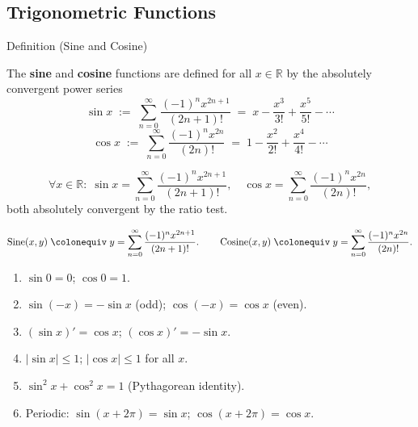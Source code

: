 
\subsection*{Trigonometric Functions}
\label{sec:trigonometric}

\begin{definitionbox}{Definition (Sine and Cosine)}
\begin{definition}
\label{def:sine-cosine}
The \textbf{sine} and \textbf{cosine} functions are defined for all
$x \in \mathbb{R}$ by the absolutely convergent power series
\[
  \sin x \;:=\;
  \sum_{n=0}^{\infty} \frac{(-1)^n x^{2n+1}}{(2n+1)!}
  \;=\; x - \frac{x^3}{3!} + \frac{x^5}{5!} - \cdots
\]
\[
  \cos x \;:=\;
  \sum_{n=0}^{\infty} \frac{(-1)^n x^{2n}}{(2n)!}
  \;=\; 1 - \frac{x^2}{2!} + \frac{x^4}{4!} - \cdots
\]
\end{definition}
\end{definitionbox}\begin{remark*}
\[
  \forall x \in \mathbb{R} :\;
  \sin x = \sum_{n=0}^\infty \frac{(-1)^n x^{2n+1}}{(2n+1)!},
  \quad
  \cos x = \sum_{n=0}^\infty \frac{(-1)^n x^{2n}}{(2n)!},
\]
both absolutely convergent by the ratio test.
\end{remark*}

\begin{remark*}
\[
  \operatorname{Sine}(x,y)
  \;\colonequiv\;
  y = \sum_{n=0}^\infty \frac{(-1)^n x^{2n+1}}{(2n+1)!}.
  \qquad
  \operatorname{Cosine}(x,y)
  \;\colonequiv\;
  y = \sum_{n=0}^\infty \frac{(-1)^n x^{2n}}{(2n)!}.
\]
\end{remark*}

\begin{remark*}
\begin{enumerate}[label=(\roman*)]
  \item $\sin 0 = 0$;\; $\cos 0 = 1$.
  \item $\sin(-x) = -\sin x$ (odd);\; $\cos(-x) = \cos x$ (even).
  \item $(\sin x)' = \cos x$;\; $(\cos x)' = -\sin x$.
  \item $|\sin x| \leq 1$;\; $|\cos x| \leq 1$ for all $x$.
  \item $\sin^2 x + \cos^2 x = 1$ (Pythagorean identity).
  \item Periodic: $\sin(x+2\pi) = \sin x$;\; $\cos(x+2\pi) = \cos x$.
\end{enumerate}
\end{remark*}

